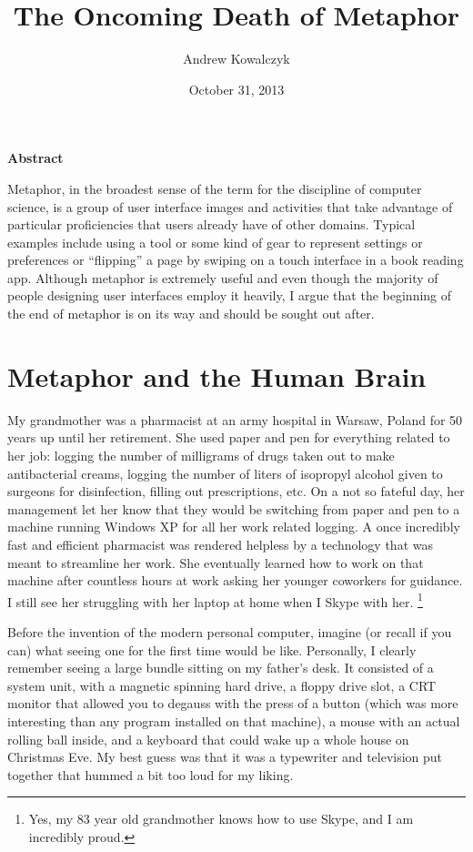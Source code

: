 \documentclass[11pt, oneside]{article}
\title{The Oncoming Death of Metaphor}
\author{Andrew Kowalczyk}
\date{October 31, 2013}
\begin{document}
\maketitle
\centerline{\textbf{Abstract}}
Metaphor, in the broadest sense of the term for the discipline of computer science, is a group of user interface images and activities that take advantage of particular proficiencies that users already have of other domains. Typical examples include using a tool or some kind of gear to represent settings or preferences or ``flipping'' a page by swiping on a touch interface in a book reading app. Although metaphor is extremely useful and even though the majority of people designing user interfaces employ it heavily, I argue that the beginning of the end of metaphor is on its way and should be sought out after.

\pagebreak
\section{Metaphor and the Human Brain} 
My grandmother was a pharmacist at an army hospital in Warsaw, Poland for 50 years up until her retirement. She used paper and pen for everything related to her job: logging the number of milligrams of drugs taken out to make antibacterial creams, logging the number of liters of isopropyl alcohol given to surgeons for disinfection, filling out prescriptions, etc. On a not so fateful day, her management let her know that they would be switching from paper and pen to a machine running Windows XP for all her work related logging. A once incredibly fast and efficient pharmacist was rendered helpless by a technology that was meant to streamline her work. She eventually learned how to work on that machine after countless hours at work asking her younger coworkers for guidance. I still see her struggling with her laptop at home when I Skype with her. \footnote{Yes, my 83 year old grandmother knows how to use Skype, and I am incredibly proud.}

Before the invention of the modern personal computer, imagine (or recall if you can) what seeing one for the first time would be like.
Personally, I clearly remember seeing a large bundle sitting on my father's desk. It consisted of a system unit, with a magnetic spinning hard drive, a floppy drive slot, a CRT monitor that allowed you to degauss with the press of a button (which was more interesting than any program installed on that machine), a mouse with an actual rolling ball inside, and a keyboard that could wake up a whole house on Christmas Eve. My best guess was that it was a typewriter and television put together that hummed a bit too loud for my liking.
\end{document}
